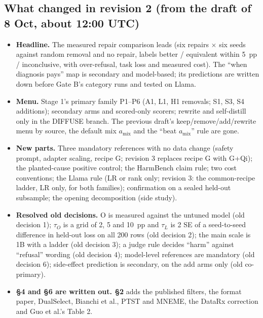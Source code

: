 \documentclass{article}
\theoremstyle{plain}
\theoremstyle{definition}
\theoremstyle{remark}
\begin{document}
\subsection{What changed in revision 2 (from the draft of 8 Oct, about 12:00 UTC)}

\begin{itemize}
  \item \textbf{Headline.} The measured repair comparison leads (six repairs
        $\times$ six seeds against random removal and no repair, labels better /
        equivalent within 5~pp / inconclusive, with over-refusal, task loss and
        measured cost). The ``when diagnosis pays'' map is secondary and
        model-based; its predictions are written down before Gate B's category
        runs and tested on Llama.
  \item \textbf{Menu.} Stage 1's primary family P1--P6 (A1, L1, H1 removals; S1,
        S3, S4 additions); secondary arms and scored-only scorers; rewrite and
        self-distill only in the DIFFUSE branch. The previous draft's
        keep/remove/add/rewrite menu by source, the default mix
        $a_{\mathrm{mix}}$ and the ``beat $a_{\mathrm{mix}}$'' rule are gone.
  \item \textbf{New parts.} Three mandatory references with no data change
        (safety prompt, adapter scaling, recipe G; revision 3 replaces recipe G
        with G+Qi); the planted-cause positive control; the HarmBench claim
        rule; two cost conventions; the Llama rule (LR or rank only; revision 3:
        the common-recipe ladder, LR only, for both families); confirmation on a
        sealed held-out subsample; the opening decomposition (side study).
  \item \textbf{Resolved old decisions.} O is measured against the untuned model
        (old decision 1); $\tau_{O}$ is a grid of 2, 5 and 10~pp and $\tau_{L}$
        is 2 SE of a seed-to-seed difference in held-out loss on all 200 rows
        (old decision 2); the main scale is 1B with a ladder (old decision 3); a
        judge rule decides ``harm'' against ``refusal'' wording (old decision
        4); model-level references are mandatory (old decision 6); side-effect
        prediction is secondary, on the add arms only (old co-primary).
  \item \textbf{\S{}4 and \S{}6 are written out. \S{}2} adds the published
        filters, the format paper, DualSelect, Bianchi et al., PTST and MNEME,
        the DataRx correction and Guo et al.'s Table 2.
\end{itemize}
\end{document}
